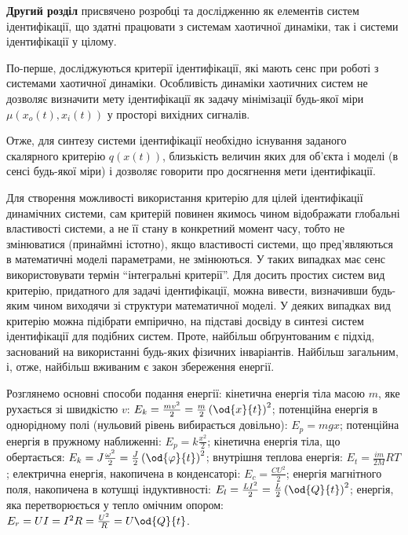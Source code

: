 \documentclass[a4paper,13pt]{atuaref}
\begin{document}
\textbf{Другий розділ}
присвячено розробці та дослідженню як елементів систем ідентифікації,
що здатні працювати з системам хаотичної динаміки, так і системи ідентифікації у цілому.

По-перше, досліджуються критерії ідентифікації,
які мають сенс при роботі з системами
хаотичної динаміки.
Особливість динаміки хаотичних систем не дозволяє визначити мету ідентифікації
як задачу мінімізації будь-якої міри
$\mu (x_o (t), x_i (t))$ у просторі вихідних сигналів.%

Отже, для синтезу системи ідентифікації необхідно існування заданого скалярного
критерію $q(x(t))$, близькість величин яких для об'єкта і моделі (в сенсі
будь-якої міри) і дозволяє говорити про досягнення мети ідентифікації.

Для створення можливості використання критерію для цілей ідентифікації
динамічних системи, сам критерій повинен якимось чином відображати глобальні
властивості системи, а не її стану в конкретний момент часу, тобто не
змінюватися (принаймні істотно), якщо властивості системи, що пред'являються в
математичні моделі параметрами, не змінюються. У таких випадках має сенс
використовувати термін ``інтегральні критерії''.
Для досить простих систем вид критерію, придатного для задачі ідентифікації,
можна вивести, визначивши будь-яким чином виходячи зі структури математичної
моделі. У деяких випадках вид критерію можна підібрати емпірично, на
підставі досвіду в синтезі систем ідентифікації для подібних систем. Проте,
найбільш обґрунтованим є підхід, заснований на використанні будь-яких фізичних
інваріантів.
Найбільш загальним, і, отже, найбільш вживаним є закон збереження енергії.

Розглянемо основні способи подання енергії:
кінетична енергія тіла масою $m$, яке рухається зі швидкістю $v$:
$E_k = \frac{mv^2}{2} = \frac{m}{2} \left( \od{x}{t} \right)^2$;
потенційна енергія в однорідному полі (нульовий рівень вибирається довільно):
$E_p = m g x$;
потенційна енергія в пружному наближенні:
$E_p = k \frac{x^2}{2}$;
кінетична енергія тіла, що обертається:
$E_k = J \frac{\omega^2}{2} = \frac{J}{2} \left( \od{\varphi}{t} \right)^2$;
внутрішня теплова енергія:
$E_t = \frac{im}{2M} RT$;
електрична енергія, накопичена в конденсаторі:
$E_c = \frac{C U^2}{2}$;
енергія магнітного поля, накопичена в котушці індуктивності:
$E_l = \frac{L I^2}{2} = \frac{L}{2} \left( \od{Q}{t}\right)^2$;
енергія, яка перетворюється у тепло омічним опором:
$E_r = U I = I^2 R = \frac{U^2}{R} = U \od{Q}{t}$.
\end{document}
